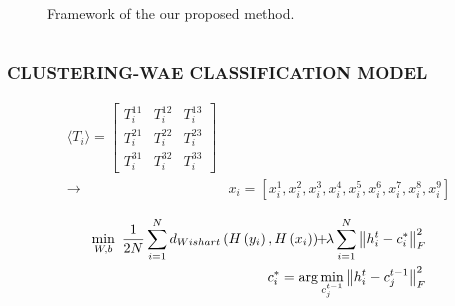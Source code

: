 \documentclass[10pt]{beamer}
\begin{document}
\begin{frame}
\begin{columns}
\begin{column}{0.5\textwidth}
\begin{figure}
\centering
{}
\caption{Framework of the our proposed method.}
\label{fig:three}
\end{figure}
\end{column}
\end{columns}
\end{frame}

\begin{frame}
\frametitle{CLUSTERING-WAE CLASSIFICATION MODEL}

\begin{equation} \label{eq:four}
\begin{split}
\langle T_i\rangle =\left[{ {\begin{array}{*{20}{c}} {T_{i}^{11}}& {T_{i}^{12}}& {T_{i}^{13}}\\ {T_{i}^{21}}& {T_{i}^{22}}& {T_{i}^{23}}\\ {T_{i}^{31}}& {T_{i}^{32}}& {T_{i}^{33}} \end{array}} }\right] \\
\to&{x_{i}} = \left [{ {x_{i}^{1},x_{i}^{2},x_{i}^{3},x_{i}^{4},x_{i}^{5},x_{i}^{6},x_{i}^{7},x_{i}^{8},x_{i}^{9}} }\right ]
\end{split}
\end{equation}

\begin{equation} \label{eq:five}
\begin{split}
\min \limits _{W,b}~\frac {1}{2N}\sum \limits _{i = 1}^{N} {{d_{Wishart}}\left ({ {H\left ({ {y_{i}} }\right ),H\left ({ {x_{i}} }\right )} }\right )} \! \!+\! \!\lambda \sum \limits _{i = 1}^{N} {\left \|{ {h_{i}^{t} - c_{i}^{*}} }\right \|_{F}^{2}} \\
\hphantom {\min \limits _{W,b}~}c_{i}^{*} = \arg \min \limits _{c_{j}^{t - 1}} \left \|{ {h_{i}^{t} - c_{j}^{t - 1}} }\right \|_{F}^{2}
\end{split}
\end{equation}

\end{frame}
\end{document}
